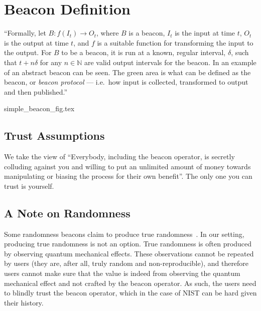\section{Beacon Definition}


\enquote{Formally, let $B: f(I_t) \rightarrow O_t$, where $B$ is a beacon, $I_t$ is the input at time $t$, $O_t$ is the output at time $t$, and $f$ is a suitable function for transforming the input to the output.
For $B$ to be a beacon, it is run at a known, regular interval, $\delta$, such that $t+n\delta$ for any $n \in \mathbb{N}$ are valid output intervals for the beacon.
In  an example of an abstract beacon can be seen.
The green area is what can be defined as the beacon, or \emph{beacon protocol} --- i.e.\ how input is collected, transformed to output and then published.}

{simple_beacon_fig.tex}


\subsection{Trust Assumptions}

We take the view of \enquote{Everybody, including the beacon operator, is secretly colluding against you and willing to put an unlimited amount of money towards manipulating or biasing the process for their own benefit}.
The only one you can trust is yourself.

\subsection{A Note on Randomness}
Some randomness beacons claim to produce true randomness~\cite{nistbeacon}.
In our setting, producing true randomness is not an option.
True randomness is often produced by observing quantum mechanical effects.
These observations cannot be repeated by users (they are, after all, truly random and non-reproducible), and therefore users cannot make sure that the value is indeed from observing the quantum mechanical effect and not crafted by the beacon operator.
As such, the users need to blindly trust the beacon operator, which in the case of NIST can be hard given their history\cite{nytimes-nsabackdoors, nytimes-nsaconstants, nist2014backdoor}.

